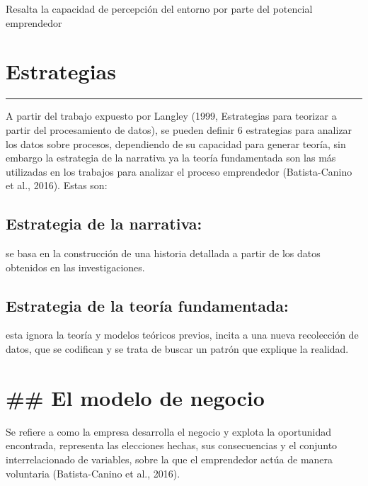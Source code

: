 \documentclass[
  letterpaper,
  DIV=11,
  numbers=noendperiod]{scrreprt}
\begin{document}
Resalta la capacidad de percepción del entorno por parte del potencial
emprendedor

\hypertarget{estrategias}{%
\section{Estrategias}\label{estrategias}}

\begin{center}\rule{0.5\linewidth}{0.5pt}\end{center}

A partir del trabajo expuesto por Langley (1999, Estrategias para
teorizar a partir del procesamiento de datos), se pueden definir 6
estrategias para analizar los datos sobre procesos, dependiendo de su
capacidad para generar teoría, sin embargo la estrategia de la narrativa
ya la teoría fundamentada son las más utilizadas en los trabajos para
analizar el proceso emprendedor (Batista-Canino et al., 2016). Estas
son:

\hypertarget{estrategia-de-la-narrativa}{%
\subsection{Estrategia de la
narrativa:}\label{estrategia-de-la-narrativa}}

se basa en la construcción de una historia detallada a partir de los
datos obtenidos en las investigaciones.

\hypertarget{estrategia-de-la-teoruxeda-fundamentada}{%
\subsection{Estrategia de la teoría
fundamentada:}\label{estrategia-de-la-teoruxeda-fundamentada}}

esta ignora la teoría y modelos teóricos previos, incita a una nueva
recolección de datos, que se codifican y se trata de buscar un patrón
que explique la realidad.

\hypertarget{el-modelo-de-negocio}{%
\section{\#\# El modelo de negocio}\label{el-modelo-de-negocio}}

Se refiere a como la empresa desarrolla el negocio y explota la
oportunidad encontrada, representa las elecciones hechas, sus
consecuencias y el conjunto interrelacionado de variables, sobre la que
el emprendedor actúa de manera voluntaria (Batista-Canino et al., 2016).
\end{document}
